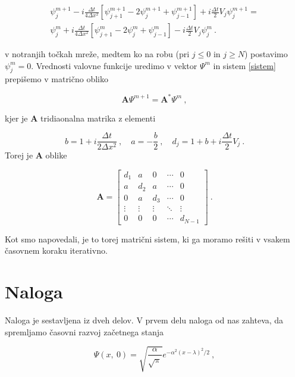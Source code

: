 \documentclass[a4paper]{article}
\begin{document}
\begin{multline}
    \psi_j^{m+1} - i \frac{\Delta t}{4\Delta x^2}\left[\psi_{j+1}^{m+1} - 2\psi_j^{m+1} + \psi_{j-1}^{m+1}\right] + i \frac{\Delta t}{2} V_j \psi_j^{m+1} = \\
    \psi_j^m + i \frac{\Delta t}{4\Delta x^2}\left[\psi_{j+1}^m - 2\psi_j^m + \psi_{j-1}^m\right] - i \frac{\Delta t}{2}V_j\psi_j^m\>.
    \label{sistem}
\end{multline}

v notranjih točkah mreže, medtem ko na robu (pri $j\le 0$ in $j\ge N$) postavimo $\psi_j^{m} = 0$. Vrednosti valovne funkcije uredimo v 
vektor $\Psi^m$ in sistem \ref{sistem} prepišemo v matrično obliko

\begin{equation}
    \mathbf{A}\Psi^{m+1} = \mathbf{A^*}\Psi^m\>,
\end{equation}

kjer je $\mathbf{A}$ tridiaonalna matrika z elementi

\begin{equation}
    b = 1 + i\frac{\Delta t}{2\Delta x^2}\>,\quad a = -\frac{b}{2}\>,\quad d_j = 1 + b + i\frac{\Delta t}{2}V_j\>.
\end{equation}
Torej je $\mathbf{A}$ oblike

\begin{equation}
    \mathbf{A} = \begin{bmatrix}
        d_1 & a & 0 & \cdots & 0 \\
        a & d_2 & a & \cdots & 0 \\
        0 & a & d_3 & \cdots & 0 \\
        \vdots & \vdots & \vdots & \ddots & \vdots \\
        0 & 0 & 0 & \cdots & d_{N-1}
    \end{bmatrix}\>.
\end{equation}

Kot smo napovedali, je to torej matrični sistem, ki ga moramo rešiti v vsakem časovnem koraku iterativno.

\section{Naloga}
Naloga je sestavljena iz dveh delov. V prvem delu naloga od nas zahteva, da spremljamo časovni razvoj 
začetnega stanja

\begin{equation}
    \Psi(x,\>0) = \sqrt{\frac{\alpha}{\sqrt{\pi}}} e^{-\alpha^2(x-\lambda)^2/2}\>,
    \label{zacetno_stanje1}
\end{equation}
\end{document}
